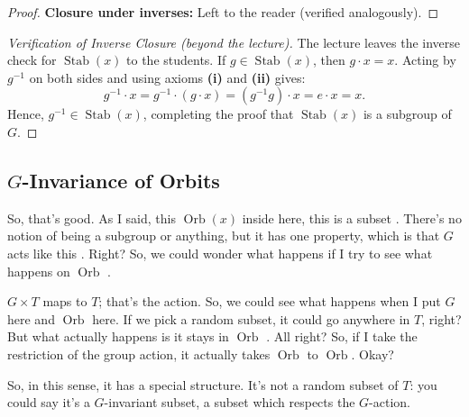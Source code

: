 \begin{proofWrapper}
\begin{content}
\begin{proof}
\textbf{Closure under inverses:} Left to the reader (verified analogously).
\end{proof}

\begin{proof}[Verification of Inverse Closure (beyond the lecture)]
The lecture leaves the inverse check for $\operatorname{Stab}(x)$ to the students. If $g \in \operatorname{Stab}(x)$, then $g \cdot x = x$. Acting by $g^{-1}$ on both sides and using axioms \textbf{(i)} and \textbf{(ii)} gives:
\[
g^{-1} \cdot x = g^{-1} \cdot (g \cdot x) = (g^{-1} g) \cdot x = e \cdot x = x.
\]
Hence, $g^{-1} \in \operatorname{Stab}(x)$, completing the proof that $\operatorname{Stab}(x)$ is a subgroup of $G$.
\end{proof}
\end{content}
\end{proofWrapper}

\subsection{\texorpdfstring{$G$}{G}-Invariance of Orbits}

\begin{speech}[00:20:19 - 00:21:14]
So, that's good. As I said, this $\operatorname{Orb}(x)$ inside here, this is a subset . There's no notion of being a subgroup or anything, but it has one property, which is that $G$ acts like this . Right? So, we could wonder what happens if I try to see what happens on $\operatorname{Orb}$ .

$G \times T$ maps to $T$; that's the action. So, we could see what happens when I put $G$ here and $\operatorname{Orb}$ here. If we pick a random subset, it could go anywhere in $T$, right? But what actually happens is it stays in $\operatorname{Orb}$ . All right? So, if I take the restriction of the group action, it actually takes $\operatorname{Orb}$ to $\operatorname{Orb}$. Okay?

So, in this sense, it has a special structure. It's not a random subset of $T$: you could say it's a $G$-invariant subset, a subset which respects the $G$-action.
\end{speech}

